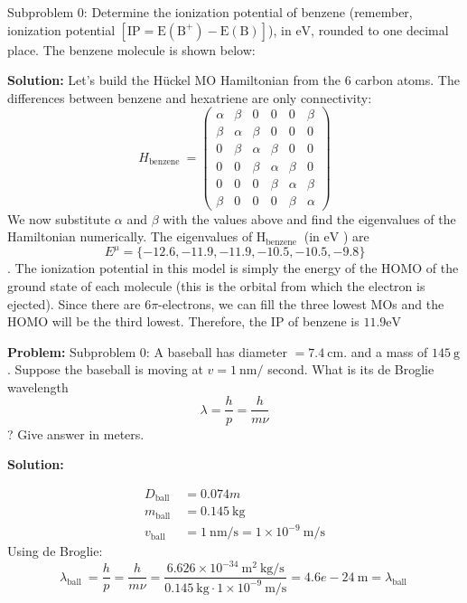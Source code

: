 \documentclass[10pt]{article}
\begin{document}
Subproblem 0: Determine the ionization potential of benzene (remember, ionization potential $\left[\mathrm{IP}=\mathrm{E}\left(\mathrm{B}^{+}\right)-\mathrm{E}(\mathrm{B})\right]$), in $\mathrm{eV}$, rounded to one decimal place.  The benzene molecule is shown below:


\textbf{Solution:}
Let's build the Hückel MO Hamiltonian from the 6 carbon atoms.  The differences between benzene and hexatriene are only connectivity:
\[
H_{\text {benzene }}=\left(\begin{array}{cccccc}
\alpha & \beta & 0 & 0 & 0 & \beta \\
\beta & \alpha & \beta & 0 & 0 & 0 \\
0 & \beta & \alpha & \beta & 0 & 0 \\
0 & 0 & \beta & \alpha & \beta & 0 \\
0 & 0 & 0 & \beta & \alpha & \beta \\
\beta & 0 & 0 & 0 & \beta & \alpha
\end{array}\right)
\]
We now substitute $\alpha$ and $\beta$ with the values above and find the eigenvalues of the Hamiltonian numerically. The eigenvalues of $\mathrm{H}_{\text {benzene }}$ (in $\mathrm{eV}$ ) are
\[
E^{\mu}=\{-12.6,-11.9,-11.9,-10.5,-10.5,-9.8\}
\].
The ionization potential in this model is simply the energy of the HOMO of the ground state of each molecule (this is the orbital from which the electron is ejected). Since there are $6 \pi$-electrons, we can fill the three lowest MOs and the HOMO will be the third lowest. Therefore, the IP of benzene is $\boxed{11.9} \mathrm{eV}$


\textbf{Problem:}
Subproblem 0: A baseball has diameter $=7.4 \mathrm{~cm}$. and a mass of $145 \mathrm{~g}$. Suppose the baseball is moving at $v=1 \mathrm{~nm} /$ second. What is its de Broglie wavelength
\[
\lambda=\frac{h}{p}=\frac{h}{m \nu}
\]
?  Give answer in meters.


\textbf{Solution:}


\[
\begin{aligned}
D_{\text {ball }} &=0.074 m \\
m_{\text {ball }} &=0.145 \mathrm{~kg} \\
v_{\text {ball }} &=1 \mathrm{~nm} / \mathrm{s}=1 \times 10^{-9} \mathrm{~m} / \mathrm{s}
\end{aligned}
\]
Using de Broglie:
\[
\lambda_{\text {ball }}=\frac{h}{p}=\frac{h}{m \nu}=\frac{6.626 \times 10^{-34} \mathrm{~m}^{2} \mathrm{~kg} / \mathrm{s}}{0.145 \mathrm{~kg} \cdot 1 \times 10^{-9} \mathrm{~m} / \mathrm{s}}=\boxed{4.6e-24} \mathrm{~m}=\lambda_{\text {ball }}
\]
\end{document}
